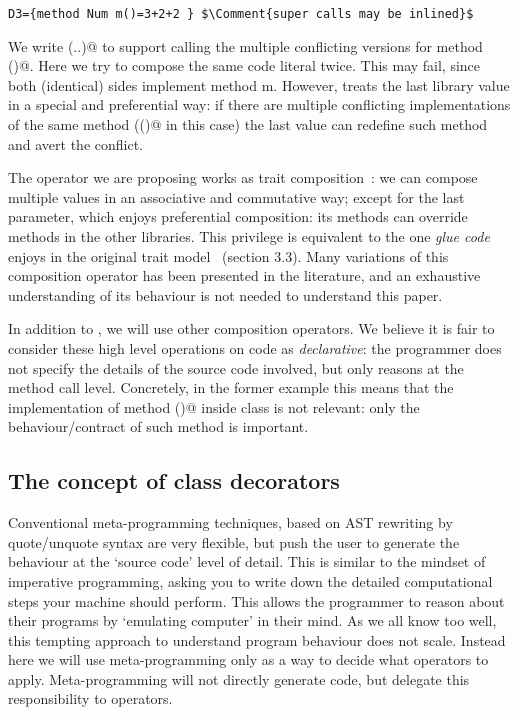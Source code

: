 \begin{lstlisting}
D3={method Num m()=3+2+2 } $\Comment{super calls may be inlined}$
\end{lstlisting}

We write (..)@ to support calling the multiple conflicting versions
for method \Q@m()@.
Here we try to compose the same code literal twice.
This may fail, since both (identical) sides implement method m.
However, \Q@Override@ treats the last library value in a special
 and preferential way:
if there are multiple conflicting implementations of the same method 
(\Q@m()@ in this case)
the last value can redefine such method and avert the conflict.

The \Q@Override@ operator we are proposing works as 
trait composition~\cite{scharli2003traits}:
we can compose multiple \Q@Library@ values in
an associative and commutative way;
except for the last parameter, which
enjoys preferential composition:
its methods can override methods in the other
libraries. This privilege is equivalent to the 
one \emph{glue code} enjoys in the original trait model 
~\cite{scharli2003traits}(section 3.3).
Many variations of this composition operator has been presented in the literature,
and an exhaustive understanding of its behaviour is not needed to
understand this paper.

In addition to \Q@Override@, we will use other composition operators.
We believe it is fair to consider these high level operations on code as \emph{declarative}:
 the programmer does not specify the details of the source code
involved, but only reasons at the method call level.
Concretely, in the former example this means that the implementation of method \Q@m()@
inside class \Q@C@ is not relevant: only the behaviour/contract of such method is important.





\subsection*{The concept of class decorators}

Conventional meta-programming techniques, based on AST rewriting by quote/unquote syntax
are very flexible, but push the user to generate the behaviour at the `source code' level of detail.
This is similar to the mindset of imperative programming, asking you to write down the
detailed computational steps your machine should perform.
This allows the programmer to reason about their programs by `emulating computer' in their mind.
As we all know too well, this tempting approach to understand  program behaviour does not scale.
Instead here we will use meta-programming only as a way to decide what operators to apply. Meta-programming will not directly generate code, but delegate this responsibility to operators.

